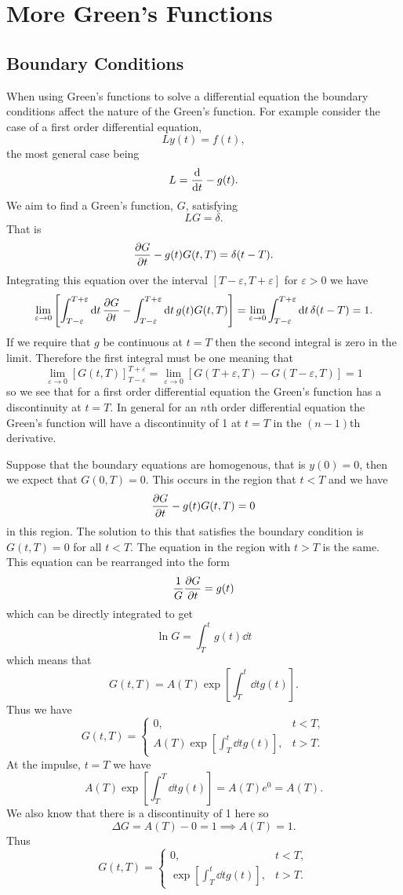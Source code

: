 \documentclass[a4paper]{article}
\begin{document}
    \section{More Green's Functions}
    \subsection{Boundary Conditions}
    When using Green's functions to solve a differential equation the boundary conditions affect the nature of the Green's function.
    For example consider the case of a first order differential equation, 
    \[Ly(t) = f(t),\]
    the most general case being
    \[L = \dv{t} - g(t).\]
    We aim to find a Green's function, \(G\), satisfying
    \[LG = \delta.\]
    That is
    \[\pdv{G}{t} - g(t)G(t, T) = \delta(t - T).\]
    Integrating this equation over the interval \([T-\varepsilon, T+\varepsilon]\) for \(\varepsilon > 0\) we have
    \[\lim_{\varepsilon\to 0}\left[\int_{T-\varepsilon}^{T+\varepsilon} \dd{t}\pdv{G}{t} - \int_{T-\varepsilon}^{T+\varepsilon}\dd{t}g(t)G(t, T)\right] = \lim_{\varepsilon\to 0} \int_{T-\varepsilon}^{T+\varepsilon} \dd{t} \delta(t - T) = 1.\]
    If we require that \(g\) be continuous at \(t = T\) then the second integral is zero in the limit.
    Therefore the first integral must be one meaning that
    \[\lim_{\varepsilon\to 0}[G(t, T)]_{T-\varepsilon}^{T+\varepsilon} = \lim_{\varepsilon\to 0}[G(T+\varepsilon, T) - G(T-\varepsilon, T)] = 1\]
    so we see that for a first order differential equation the Green's function has a discontinuity at \(t = T\).
    In general for an \(n\)th order differential equation the Green's function will have a discontinuity of 1 at \(t = T\) in the \((n - 1)\)th derivative.
    
    Suppose that the boundary equations are homogenous, that is \(y(0) = 0\), then we expect that \(G(0, T) = 0\).
    This occurs in the region that \(t < T\) and we have
    \[\pdv{G}{t} - g(t)G(t, T) = 0\]
    in this region.
    The solution to this that satisfies the boundary condition is \(G(t, T) = 0\) for all \(t < T\).
    The equation in the region with \(t > T\) is the same.
    This equation can be rearranged into the form
    \[\frac{1}{G}\pdv{G}{t} = g(t)\]
    which can be directly integrated to get
    \[\ln G = \int_T^t g(t) \dd{t}\]
    which means that
    \[G(t, T) = A(T)\exp\left[\int_T^t\dd{t}g(t)\right].\]
    Thus we have
    \[
        G(t, T) = 
        \begin{cases}
            0, & t < T,\\
            A(T)\exp\left[\int_T^t\dd{t}g(t)\right], & t > T.
        \end{cases}
    \]
    At the impulse, \(t = T\) we have
    \[A(T)\exp\left[\int_T^T\dd{t}g(t)\right] = A(T)e^0 = A(T).\]
    We also know that there is a discontinuity of 1 here so
    \[\Delta G = A(T) - 0 = 1 \implies A(T) = 1.\]
    Thus
    \[
        G(t, T) = 
        \begin{cases}
            0, & t < T,\\
            \exp\left[\int_T^t\dd{t}g(t)\right], & t > T.
        \end{cases}
    \]
    
\end{document}
